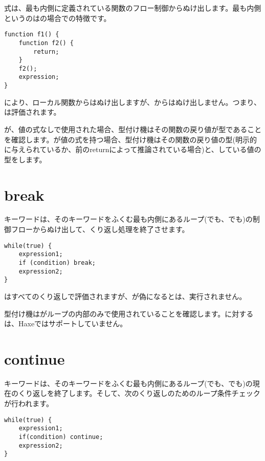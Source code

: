 式は、最も内側に定義されている関数のフロー制御からぬけ出します。最も内側というのはの場合での特徴です。

\begin{lstlisting}
function f1() {
	function f2() {
		return;
	}
	f2();
	expression;
}
\end{lstlisting}

により、ローカル関数からはぬけ出しますが、からはぬけ出しません。つまり、は評価されます。

が、値の式なしで使用された場合、型付け機はその関数の戻り値が型であることを確認します。が値の式を持つ場合、型付け機はその関数の戻り値の型(明示的に与えられているか、前のreturnによって推論されている場合)と、している値の型をします。

\section{break}
\label{expression-break}

キーワードは、そのキーワードをふくむ最も内側にあるループ(でも、でも)の制御フローからぬけ出して、くり返し処理を終了させます。

\begin{lstlisting}
while(true) {
	expression1;
	if (condition) break;
	expression2;
}
\end{lstlisting}

はすべてのくり返しで評価されますが、が偽になるとは、実行されません。

型付け機はがループの内部のみで使用されていることを確認します。に対するは、Haxeではサポートしていません。

\section{continue}
\label{expression-continue}

キーワードは、そのキーワードをふくむ最も内側にあるループ(でも、でも)の現在のくり返しを終了します。そして、次のくり返しのためのループ条件チェックが行われます。

\begin{lstlisting}
while(true) {
	expression1;
	if(condition) continue;
	expression2;
}
\end{lstlisting}

